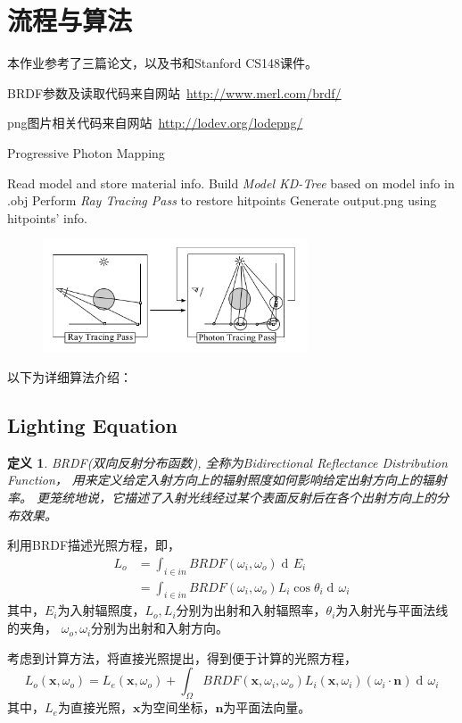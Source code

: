 \documentclass[a4paper,12pt]{article}
\theoremstyle{plain}
\newtheorem{thmdef}{\hspace{\parindent}定义}
\numberwithin{thmdef}{section}
\begin{document}
\section{流程与算法}
本作业参考了三篇论文\cite{ppm}\cite{ppr}\cite{lirui}，以及书\cite{pm}和Stanford CS148课件。\par
BRDF参数及读取代码来自网站\ \url{http://www.merl.com/brdf/}\par
png图片相关代码来自网站\ \url{http://lodev.org/lodepng/}
\\
\begin{algorithm}[H]
\caption{Progressive Photon Mapping}
\LinesNumbered
{}
Read model and store material info.\;
Build \textit{Model KD-Tree} based on model info in .obj\;
Perform \textit{Ray Tracing Pass} to restore hitpoints\;
Generate output.png using hitpoints' info.\;
\end{algorithm}\par

\begin{figure}[!h]
\centering
\includegraphics[width=0.7\textwidth]{overall}
\end{figure}
以下为详细算法介绍：
\subsection{Lighting Equation}
\begin{thmdef}
BRDF(双向反射分布函数), 全称为Bidirectional Reflectance Distribution Function，%
用来定义给定入射方向上的辐射照度如何影响给定出射方向上的辐射率。%
更笼统地说，它描述了入射光线经过某个表面反射后在各个出射方向上的分布效果。
\end{thmdef}\par
利用BRDF描述光照方程，即，
\begin{align}
L_o&=\int_{i\in in}BRDF(\omega_i,\omega_o)\mathop{d\!}E_i\\
&=\int_{i\in in}BRDF(\omega_i,\omega_o)L_i\cos\theta_i\mathop{d\!}\omega_i
\end{align}
其中，$E_i$为入射辐照度，$L_o,L_i$分别为出射和入射辐照率，$\theta_i$为入射光与平面法线的夹角，%
$\omega_o,\omega_i$分别为出射和入射方向。\par
考虑到计算方法，将直接光照提出，得到便于计算的光照方程，
\begin{equation}
L_o(\mathbf{x},\omega_o)=L_e(\mathbf{x},\omega_o)+\int_\Omega BRDF(\mathbf{x},\omega_i,%
\omega_o)L_i(\mathbf{x},\omega_i)(\omega_i\cdot\mathbf{n})\mathop{d\!}\omega_i
\end{equation}
其中，$L_e$为直接光照，$\mathbf{x}$为空间坐标，$\mathbf{n}$为平面法向量。
\end{document}
